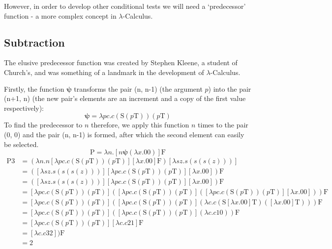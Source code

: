 \documentclass[Master.tex]{subfiles}
\begin{document}
However, in order to develop other conditional tests we will need a `predecessor' function - a more complex concept in $\lambda$-Calculus.
\subsection{Subtraction}

The elusive predecessor function was created by Stephen Kleene, a student of Church's, and was something of a landmark in the development of $\lambda$-Calculus.

Firstly, the function $\bm{\psi}$ transforms the pair (n, n-1) (the argument $p$) into the pair (n+1, n) (the new pair's elements are an increment and a copy of the first value respectively):
\cite{rojas2015lambdatutorial}
\begin{equation*}
\bm{\psi} = \lambda pc.c(\bm{\mathrm{S}}(p\bm{\mathrm{T}}))(p\bm{\mathrm{T}})
\end{equation*}
To find the predecessor to $n$ therefore, we apply this function $n$ times to the pair (0, 0) and the pair (n, n-1) is formed, after which the second element can easily be selected.
\cite{rojas2015lambdatutorial}
\begin{equation*}
\bm{\mathrm{P}} = \lambda n.[n \bm{\psi} (\lambda x.\bm{\mathrm{00}})] \bm{\mathrm{F}} 
\end{equation*}
\begin{equation*}
\begin{aligned}
\bm{\mathrm{P3}} &= (\lambda n.n [\lambda pc.c(\bm{\mathrm{S}}(p\bm{\mathrm{T}}))(p\bm{\mathrm{T}})] [\lambda x.\bm{\mathrm{00}}] \bm{\mathrm{F}}) [\lambda sz.s(s(s(z)))]\\
&= ([\lambda sz.s(s(s(z)))] [\lambda pc.c(\bm{\mathrm{S}}(p\bm{\mathrm{T}}))(p\bm{\mathrm{T}})] [\lambda x.\bm{\mathrm{00}}]) \bm{\mathrm{F}}\\
&= ([\lambda sz.s(s(s(z)))] [\lambda pc.c(\bm{\mathrm{S}}(p\bm{\mathrm{T}}))(p\bm{\mathrm{T}})] [\lambda x.\bm{\mathrm{00}}]) \bm{\mathrm{F}}\\
&= [\lambda pc.c(\bm{\mathrm{S}}(p\bm{\mathrm{T}}))(p\bm{\mathrm{T}})]([\lambda pc.c(\bm{\mathrm{S}}(p\bm{\mathrm{T}}))(p\bm{\mathrm{T}})]([\lambda pc.c(\bm{\mathrm{S}}(p\bm{\mathrm{T}}))(p\bm{\mathrm{T}})][\lambda x.\bm{\mathrm{00}}]))\bm{\mathrm{F}}\\
&= [\lambda pc.c(\bm{\mathrm{S}}(p\bm{\mathrm{T}}))(p\bm{\mathrm{T}})]([\lambda pc.c(\bm{\mathrm{S}}(p\bm{\mathrm{T}}))(p\bm{\mathrm{T}})](\lambda c.c(\bm{\mathrm{S}}[\lambda x.\bm{\mathrm{00}}]\bm{\mathrm{T}})([\lambda x.\bm{\mathrm{00}}]\bm{\mathrm{T}})))\bm{\mathrm{F}}\\
&= [\lambda pc.c(\bm{\mathrm{S}}(p\bm{\mathrm{T}}))(p\bm{\mathrm{T}})]([\lambda pc.c(\bm{\mathrm{S}}(p\bm{\mathrm{T}}))(p\bm{\mathrm{T}})](\lambda c.c\bm{\mathrm{10}}))\bm{\mathrm{F}}\\
&= [\lambda pc.c(\bm{\mathrm{S}}(p\bm{\mathrm{T}}))(p\bm{\mathrm{T}})][\lambda c.c\bm{\mathrm{21}}]\bm{\mathrm{F}}\\
&= [\lambda c.c\bm{\mathrm{32}} ])\bm{\mathrm{F}}\\
&= \bm{\mathrm{2}}
\end{aligned}
\end{equation*}
\end{document}
